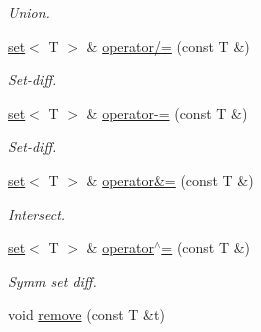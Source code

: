 \begin{DoxyCompactItemize}
\begin{DoxyCompactList}\small\item\em Union. \end{DoxyCompactList}\item 
\hypertarget{classmerlin_1_1set_a5fb011df323a4809972209667e002935}{}\hyperlink{classmerlin_1_1set}{set}$<$ T $>$ \& \hyperlink{classmerlin_1_1set_a5fb011df323a4809972209667e002935}{operator/=} (const T \&)\label{classmerlin_1_1set_a5fb011df323a4809972209667e002935}

\begin{DoxyCompactList}\small\item\em Set-\/diff. \end{DoxyCompactList}\item 
\hypertarget{classmerlin_1_1set_a90e101a698c09d1fdb4a2b0c540e91ff}{}\hyperlink{classmerlin_1_1set}{set}$<$ T $>$ \& \hyperlink{classmerlin_1_1set_a90e101a698c09d1fdb4a2b0c540e91ff}{operator-\/=} (const T \&)\label{classmerlin_1_1set_a90e101a698c09d1fdb4a2b0c540e91ff}

\begin{DoxyCompactList}\small\item\em Set-\/diff. \end{DoxyCompactList}\item 
\hypertarget{classmerlin_1_1set_a48df656e6907e78977d765ee59eadb2e}{}\hyperlink{classmerlin_1_1set}{set}$<$ T $>$ \& \hyperlink{classmerlin_1_1set_a48df656e6907e78977d765ee59eadb2e}{operator\&=} (const T \&)\label{classmerlin_1_1set_a48df656e6907e78977d765ee59eadb2e}

\begin{DoxyCompactList}\small\item\em Intersect. \end{DoxyCompactList}\item 
\hypertarget{classmerlin_1_1set_a58d08d3746bbc7d9bf1ec9fbe6451641}{}\hyperlink{classmerlin_1_1set}{set}$<$ T $>$ \& \hyperlink{classmerlin_1_1set_a58d08d3746bbc7d9bf1ec9fbe6451641}{operator$^\wedge$=} (const T \&)\label{classmerlin_1_1set_a58d08d3746bbc7d9bf1ec9fbe6451641}

\begin{DoxyCompactList}\small\item\em Symm set diff. \end{DoxyCompactList}\item 
\hypertarget{classmerlin_1_1set_adf61e75f4ccc0c093fa3759619d3f4ff}{}void \hyperlink{classmerlin_1_1set_adf61e75f4ccc0c093fa3759619d3f4ff}{remove} (const T \&t)\label{classmerlin_1_1set_adf61e75f4ccc0c093fa3759619d3f4ff}


\end{DoxyCompactItemize}

